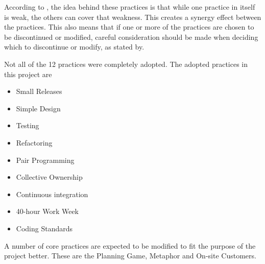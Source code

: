 According to \citet[p. 53]{xp:explained}, the idea behind these practices is that while one practice in itself is weak, the others can cover that weakness. This creates a synergy effect between the practices. This also means that if one or more of the practices are chosen to be discontinued or modified, careful consideration should be made when deciding which to discontinue or modify, as stated by.

Not all of the 12 practices were completely adopted. The adopted practices in this project are\\

\begin{itemize}
\item Small Releases
\item Simple Design
\item Testing
\item Refactoring
\item Pair Programming
\item Collective Ownership
\item Continuous integration
\item 40-hour Work Week
\item Coding Standards
\end{itemize}

A number of core practices are expected to be modified to fit the purpose of the project better. These are the Planning Game, Metaphor and On-site Customers.

